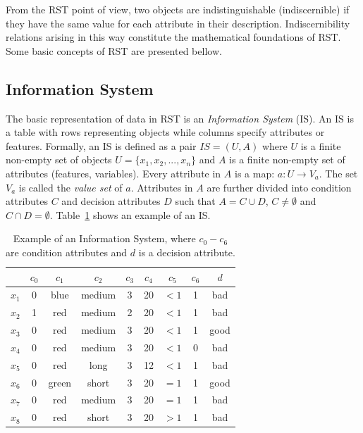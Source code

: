 \documentclass[number,preprint,review,12pt]{elsarticle}
\begin{document}
  From the RST point of view, two objects are indistinguishable (indiscernible) if they have the same value for each attribute in their description. Indiscernibility relations arising in this way constitute the mathematical foundations of RST. Some basic concepts of RST are presented bellow.
  
\subsection{Information System}
  The basic representation of data in RST is an \emph{Information System} (IS). An IS is a table with rows
  representing objects while columns specify attributes or features. Formally, an IS is defined as a pair
  $IS=(U,A)$ where $U$ is a finite non-empty set of objects $U=\lbrace x_1,x_2,...,x_n\rbrace$ and $A$ is a 
  finite non-empty set
  of attributes (features, variables). Every attribute in $A$ is a map: $a: U \rightarrow V_a$. The set $V_a$ is
  called the \textit{value set} of $a$. Attributes in $A$ are further divided into condition attributes $C$ and 
  decision attributes $D$ such that $A=C \cup D$, $C \neq \emptyset$ and $C \cap D =\emptyset$. 
  Table~\ref{tab_IS} shows an example of an IS.
  
 \begin{table}[htb]
		\caption{Example of an Information System, where $c_0-c_6$ are condition attributes and $d$ is a decision attribute.} \label{tab_IS}
		\centering
 	\begin{tabular}{c||c|c|c|c|c|c|c||c}
 			  & $c_0$ & $c_1$ & $c_2$ &  $c_3$ & $c_4$ & $c_5$ &  $c_6$ & $d$ \\
 		\hline \hline
		$x_1$ & 0 & blue  & medium & 3 & 20 & $<1$  & 1 & bad   \\
		$x_2$ & 1 & red   & medium & 2 & 20 & $<1$  & 1 & bad   \\
		$x_3$ & 0 & red   & medium & 3 & 20 & $<1$  & 1 & good   \\
		$x_4$ & 0 & red   & medium & 3 & 20 & $<1$  & 0 & bad   \\
		$x_5$ & 0 & red   & long   & 3 & 12 & $<1$  & 1 & bad   \\
		$x_6$ & 0 & green & short  & 3 & 20 & $=1$  & 1 & good   \\
		$x_7$ & 0 & red   & medium & 3 & 20 & $=1$  & 1 & bad   \\
		$x_8$ & 0 & red   & short  & 3 & 20 & $>1$  & 1 & bad   \\
 	\end{tabular}             
 \end{table}
 
\end{document}
